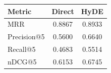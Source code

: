 \begin{tabular}{lcc}
\hline
Metric & Direct & HyDE \\
\hline
MRR & 0.8867 & 0.8933 \\
Precision@5 & 0.5600 & 0.6640 \\
Recall@5 & 0.4683 & 0.5514 \\
nDCG@5 & 0.6153 & 0.6745 \\
\hline
\end{tabular}
